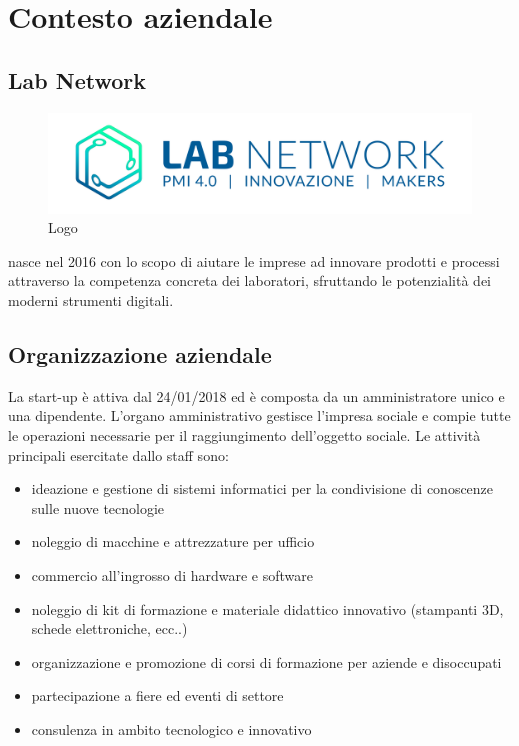 
\chapter{Contesto aziendale}
\label{cap:introduzione}

\section{Lab Network}

\begin{figure}[H]
	\begin{center}
	\includegraphics[scale=0.4]{immagini/LOGO_LABNETWORK.png}
	\caption{Logo \lab{}}
	\end{center}
\end{figure}

\lab{} nasce nel 2016 con lo scopo di aiutare le imprese ad innovare prodotti e processi attraverso la competenza concreta dei laboratori, sfruttando le potenzialità dei moderni strumenti digitali.

\section{Organizzazione aziendale}
La start-up è attiva dal 24/01/2018 ed è composta da un amministratore unico e una dipendente.
L'organo amministrativo gestisce l'impresa sociale e compie tutte le operazioni necessarie per il raggiungimento dell'oggetto sociale.
Le attività principali esercitate dallo staff sono:
\begin{itemize}
\item ideazione e gestione di sistemi informatici per la condivisione di conoscenze sulle nuove tecnologie 
\item noleggio di macchine e attrezzature per ufficio
\item commercio all'ingrosso di hardware e software
\item noleggio di kit di formazione e materiale didattico innovativo (stampanti 3D, schede elettroniche, ecc..)
\item organizzazione e promozione di corsi di formazione per aziende e disoccupati
\item partecipazione a fiere ed eventi di settore
\item consulenza in ambito tecnologico e innovativo
\end{itemize}
